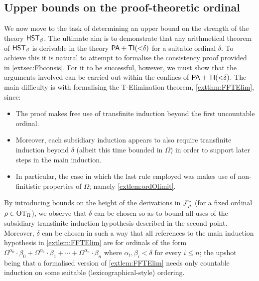 \documentclass[UKenglish,cleveref,DIV=12]{scrartcl}
\theoremstyle{definition}
\theoremstyle{definition}
\begin{document}
\subsection{Upper bounds on the proof-theoretic ordinal}\label{extsec:Fbupper1}
We now move to the task of determining an upper bound on the strength of the theory
$\mathsf{HST}_\beta$. The ultimate aim is to demonstrate that any arithmetical theorem of
$\mathsf{HST}_\beta$ is derivable in the theory $\mathsf{PA}+\mathsf{TI}(\mathord<\delta)$ for a suitable
ordinal $\delta$. To achieve this it is natural to attempt to formalise the consistency proof provided in \cref{extsec:Fbconsis}. For it to be successful, however, we must show that the arguments involved can be carried out within the confines of
$\mathsf{PA}+\mathsf{TI}(\mathord<\delta)$. The main difficulty is with formalising the T-Elimination theorem, \cref{extthm:FFTElim}, since:
\begin{itemize}
 \item The proof
  makes free use of transfinite induction beyond the first uncountable ordinal.
 \item Moreover, each subsidiary induction appears to also require transfinite
  induction beyond $\delta$ (albeit this time bounded in $\Omega$) in order to
  support later steps in the main induction.
 \item In particular, the case in which the last rule employed was \Uni\eta
  makes use of non-finitistic properties of $\Omega$; namely
  \cref{extlem:ordOlimit}.
\end{itemize}
By introducing bounds on the height of the derivations in $\mathcal{F}_\rho^*$ (for a fixed ordinal $\rho\in\mathrm{OT}_\Omega$), we observe that $\delta$ can be chosen so as to bound all uses of the subsidiary transfinite induction hypothesis described in the second point.
Moreover, $\delta$ can be
chosen in such a way that all references to the main induction hypothesis in
\cref{extlem:FFTElim} are for ordinals of the form
\linebreak$\Omega^{\alpha_0}\cdot\beta_0+\Omega^{\alpha_1}\cdot\beta_1+\cdots+\Omega^{
\alpha_n}\cdot\beta_n$ where $\alpha_i,\beta_i<\delta$ for every $i\le n$; the
upshot being that a formalised version of \cref{extlem:FFTElim} needs only countable induction on some suitable (lexicographical-style) ordering.
\end{document}
